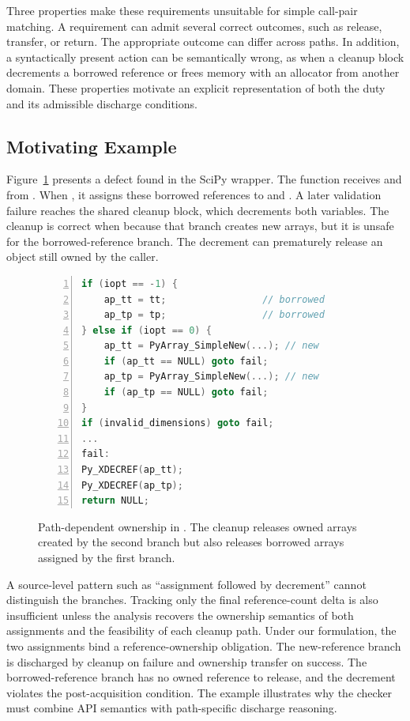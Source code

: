 Three properties make these requirements unsuitable for simple call-pair
matching. A requirement can admit several correct outcomes, such as release,
transfer, or return. The appropriate outcome can differ across paths. In
addition, a syntactically present action can be semantically wrong, as when a
cleanup block decrements a borrowed reference or frees memory with an
allocator from another domain. These properties motivate an explicit
representation of both the duty and its admissible discharge conditions.

\subsection{Motivating Example}

Figure~\ref{fig:motivation} presents a defect found in the SciPy
 wrapper. The function receives  and 
from . When , it assigns these
borrowed references to  and . A later validation
failure reaches the shared cleanup block, which decrements both variables.
The cleanup is correct when  because that branch creates new
arrays, but it is unsafe for the borrowed-reference branch. The decrement can
prematurely release an object still owned by the caller.

\begin{figure}[t]
\begin{lstlisting}[language=C,numbers=left,firstnumber=1]
if (iopt == -1) {
    ap_tt = tt;                 // borrowed
    ap_tp = tp;                 // borrowed
} else if (iopt == 0) {
    ap_tt = PyArray_SimpleNew(...); // new
    if (ap_tt == NULL) goto fail;
    ap_tp = PyArray_SimpleNew(...); // new
    if (ap_tp == NULL) goto fail;
}
if (invalid_dimensions) goto fail;
...
fail:
Py_XDECREF(ap_tt);
Py_XDECREF(ap_tp);
return NULL;
\end{lstlisting}
\caption{Path-dependent ownership in . The cleanup
releases owned arrays created by the second branch but also releases borrowed
arrays assigned by the first branch.}
\label{fig:motivation}
\end{figure}

A source-level pattern such as ``assignment followed by decrement'' cannot
distinguish the branches. Tracking only the final reference-count delta is
also insufficient unless the analysis recovers the ownership semantics of
both assignments and the feasibility of each cleanup path. Under our
formulation, the two assignments bind a reference-ownership obligation. The
new-reference branch is discharged by cleanup on failure and ownership
transfer on success. The borrowed-reference branch has no owned reference to
release, and the decrement violates the post-acquisition condition. The
example illustrates why the checker must combine API semantics with
path-specific discharge reasoning.
